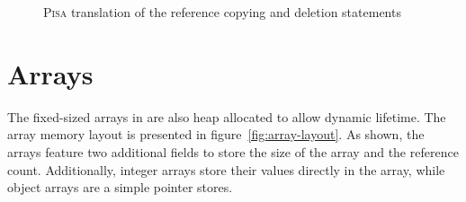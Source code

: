 \begin{figure}[ht]
\begin{subfigure}[t]{0.495\linewidth}
    \end{subfigure}
    
    \caption{\textsc{Pisa} translation of the reference copying and deletion statements}
    \label{fig:pisa-referencing}
\end{figure}

\section{Arrays}
\label{sec:arrays}
The fixed-sized arrays in \rooplpp are also heap allocated to allow dynamic lifetime. The array memory layout is presented in figure~\ref{fig:array-layout}. As shown, the arrays feature two additional fields to store the size of the array and the reference count. Additionally, integer arrays store their values directly in the array, while object arrays are a simple pointer stores.

